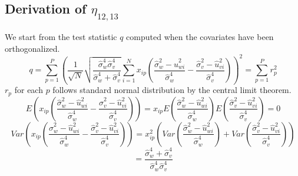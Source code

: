 \documentclass[aoas,preprint]{imsart}
\numberwithin{equation}{section}
\theoremstyle{plain}
\begin{document}
\subsection{Derivation of $\eta_{12,13}$}
We start from the test statistic $q$ computed when the covariates have been orthogonalized.
$$q = \sum_{p=1}^{P}
 \left(\frac{1}{\sqrt{N}}
 \sqrt{\frac{\hat{\sigma}_w^4 \hat{\sigma}_v^4}{\hat{\sigma}_w^4 + \hat{\sigma}_v^4}}
 \sum_{i=1}^{N} x_{ip} \left( \frac{\hat{\sigma}_w^2 - \hat{u}_{wi}^2}{\hat{\sigma}_w^4}
 - \frac{\hat{\sigma}_v^2 - \hat{u}_{vi}^2}{\hat{\sigma}_v^4}
 \right)
\right)^2 = \sum_{p=1}^{P}r_p^2$$
$r_p$ for each $p$ follows standard normal distribution by the central limit theorem. 
$$E\left(x_{ip}\left( \frac{\hat{\sigma}_w^2 - \hat{u}_{wi}^2}{\hat{\sigma}_w^4}
 - \frac{\hat{\sigma}_v^2 - \hat{u}_{vi}^2}{\hat{\sigma}_v^4}
 \right)\right) = x_{ip} E\left( \frac{\hat{\sigma}_w^2 - \hat{u}_{wi}^2}{\hat{\sigma}_w^4} \right) E\left( \frac{\hat{\sigma}_v^2 - \hat{u}_{vi}^2}{\hat{\sigma}_v^4}
 \right) = 0$$
$$Var\left(x_{ip}\left( \frac{\hat{\sigma}_w^2 - \hat{u}_{wi}^2}{\hat{\sigma}_w^4}
- \frac{\hat{\sigma}_v^2 - \hat{u}_{vi}^2}{\hat{\sigma}_v^4}
\right)\right) = 
x_{ip}^2 \left( Var\left( \frac{\hat{\sigma}_w^2 - \hat{u}_{wi}^2}{\hat{\sigma}_w^4} \right)  + Var\left( \frac{\hat{\sigma}_v^2 - \hat{u}_{vi}^2}{\hat{\sigma}_v^4}\right)\right)$$
 $$ = \frac{\hat{\sigma}_w^4 + \hat{\sigma}_v^4}{\hat{\sigma}_w^4 \hat{\sigma}_v^4}$$
\end{document}
